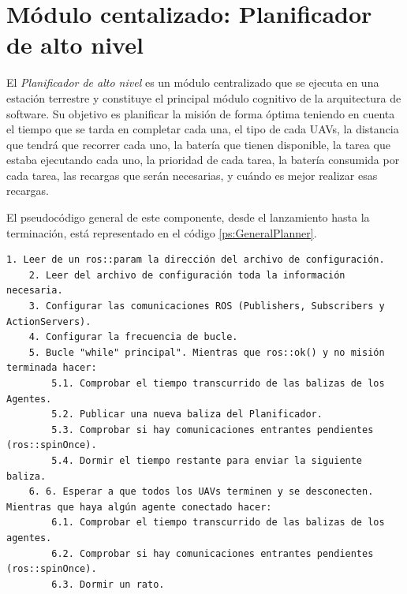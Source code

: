 \documentclass[fontsize=11pt, English=false, Español=true, Myfinal=true, twoside, numbers=noenddot]{scrbook}
\begin{document}
\section{Módulo centalizado: Planificador de alto nivel}
\label{sec:Centralised module:TaskPlanner}
El \emph{Planificador de alto nivel} es un módulo centralizado que se ejecuta en una estación terrestre y constituye el principal módulo cognitivo de la arquitectura de software. Su objetivo es planificar la misión de forma óptima teniendo en cuenta el tiempo que se tarda en completar cada una, el tipo de cada \glspl{UAV}, la distancia que tendrá que recorrer cada uno, la batería que tienen disponible, la tarea que estaba ejecutando cada uno, la prioridad de cada tarea, la batería consumida por cada tarea, las recargas que serán necesarias, y cuándo es mejor realizar esas recargas.

El pseudocódigo general de este componente, desde el lanzamiento hasta la terminación, está representado en el código \ref{ps:GeneralPlanner}.

\begin{lstlisting}[caption={General operation of \emph{High-Level Planner}'s code}, breaklines=true, label=ps:GeneralPlanner]
  1. Leer de un ros::param la dirección del archivo de configuración.
	2. Leer del archivo de configuración toda la información necesaria.
	3. Configurar las comunicaciones ROS (Publishers, Subscribers y ActionServers).
	4. Configurar la frecuencia de bucle.
	5. Bucle "while" principal". Mientras que ros::ok() y no misión terminada hacer:
		5.1. Comprobar el tiempo transcurrido de las balizas de los Agentes.
		5.2. Publicar una nueva baliza del Planificador.
		5.3. Comprobar si hay comunicaciones entrantes pendientes (ros::spinOnce).
		5.4. Dormir el tiempo restante para enviar la siguiente baliza.
	6. 6. Esperar a que todos los UAVs terminen y se desconecten. Mientras que haya algún agente conectado hacer:
		6.1. Comprobar el tiempo transcurrido de las balizas de los agentes.
		6.2. Comprobar si hay comunicaciones entrantes pendientes (ros::spinOnce).
		6.3. Dormir un rato.
\end{lstlisting}

\end{document}
